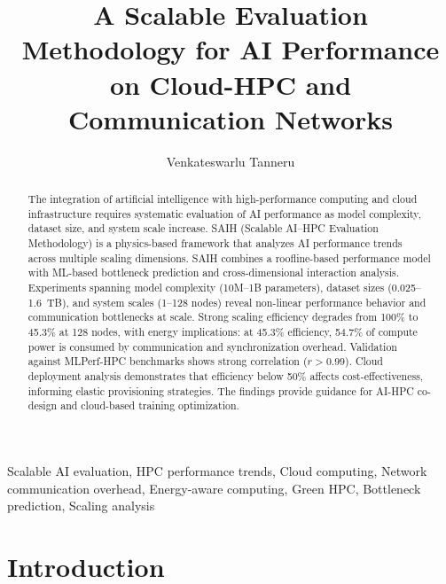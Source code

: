 \documentclass{llncs}
\begin{document}
\title{A Scalable Evaluation Methodology for AI Performance on Cloud-HPC and Communication Networks}

\author{Venkateswarlu Tanneru}



\begin{abstract}
The integration of artificial intelligence with high-performance computing and cloud infrastructure requires systematic evaluation of AI performance as model complexity, dataset size, and system scale increase. SAIH (Scalable AI--HPC Evaluation Methodology) is a physics-based framework that analyzes AI performance trends across multiple scaling dimensions. SAIH combines a roofline-based performance model with ML-based bottleneck prediction and cross-dimensional interaction analysis. Experiments spanning model complexity (10M--1B parameters), dataset sizes (0.025--1.6~TB), and system scales (1--128 nodes) reveal non-linear performance behavior and communication bottlenecks at scale. Strong scaling efficiency degrades from 100\% to 45.3\% at 128 nodes, with energy implications: at 45.3\% efficiency, 54.7\% of compute power is consumed by communication and synchronization overhead. Validation against MLPerf-HPC benchmarks shows strong correlation ($r>0.99$). Cloud deployment analysis demonstrates that efficiency below 50\% affects cost-effectiveness, informing elastic provisioning strategies. The findings provide guidance for AI-HPC co-design and cloud-based training optimization.
\end{abstract}

\begin{keywords}
Scalable AI evaluation, HPC performance trends, Cloud computing, Network communication overhead, Energy-aware computing, Green HPC, Bottleneck prediction, Scaling analysis
\end{keywords}

\maketitle

\section{Introduction}
\end{document}
